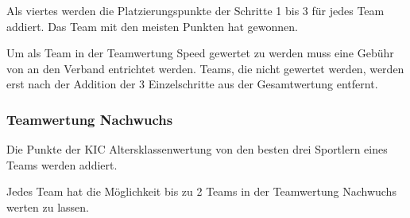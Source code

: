 Als viertes werden die Platzierungspunkte der Schritte 1 bis 3 für jedes Team addiert. Das Team mit den meisten Punkten hat gewonnen.

Um als Team in der Teamwertung Speed gewertet zu werden muss eine Gebühr von  an den Verband entrichtet werden. Teams, die nicht gewertet werden, werden erst nach der Addition der 3 Einzelschritte aus der Gesamtwertung entfernt.

\subsubsection{Teamwertung Nachwuchs}
\label{subsec:teamwertung-nachwuchs}
Die Punkte der KIC Altersklassenwertung von den besten drei Sportlern eines Teams werden addiert. 

Jedes Team hat die Möglichkeit bis zu 2 Teams in der Teamwertung Nachwuchs werten zu lassen.

